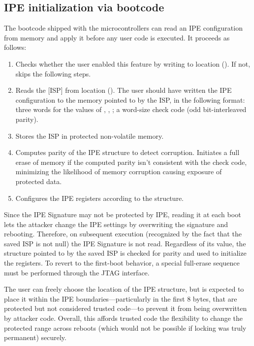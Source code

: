 \subsection{IPE initialization via bootcode}
\label{sec:bootcode}

The bootcode shipped with the \msp microcontrollers can read an IPE configuration from memory and apply it before any user code is executed.  It proceeds as follows:
\begin{enumerate}
\item Checks whether the user enabled this feature by writing  to location  (). If not, skips the following steps.
\item Reads the [ISP] from location  (). The user should have written the IPE configuration to the memory pointed to by the ISP, in the following format: three words for the values of , , ; a word-size check code (odd bit-interleaved parity).
\item Stores the ISP in protected non-volatile memory.
\item Computes parity of the IPE structure to detect corruption. Initiates a full erase of memory if the computed parity isn't consistent with the check code, minimizing the likelihood of memory corruption causing exposure of protected data.
\item Configures the IPE registers according to the structure.
\end{enumerate}

Since the IPE Signature may not be protected by IPE, reading it at each boot lets the attacker change the IPE settings by overwriting the signature and rebooting. Therefore, on subsequent execution (recognized by the fact that the saved ISP is not null) the IPE Signature is not read. Regardless of its value, the structure pointed to by the saved ISP is checked for parity and used to initialize the registers.  To revert to the first-boot behavior, a special full-erase sequence must be performed through the JTAG interface.

The user can freely choose the location of the IPE structure, but is expected to place it within the IPE boundaries---particularly in the first 8 bytes, that are protected but not considered trusted code---to prevent it from being overwritten by attacker code. Overall, this affords trusted code the flexibility to change the protected range across reboots (which would not be possible if locking was truly permanent) securely.

